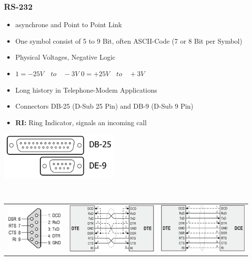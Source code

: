 \subsubsection{RS-232}
\begin{minipage}{10cm}
	\begin{itemize}
		\item asynchrone and Point to Point Link
		\item One symbol consist of 5 to 9 Bit, often \acs{ASCII}-Code (7 or 8 Bit per Symbol)
		\item Physical Voltages, Negative Logic
		\item $1=-25V \quad to \quad -3V$\newline
		$0=+25V\quad to \quad +3V$
		\item Long history in Telephone-Modem Applications
		\item Connectors DB-25 (D-Sub 25 Pin) and DB-9 (D-Sub 9 Pin)
		\item\textbf{RI: }Ring Indicator, signals an incoming call
	\end{itemize}
\end{minipage}
\begin{minipage}{6cm}
	\includegraphics[width=6cm]{images/Connectors_RS.png}
\end{minipage}
\\
\begin{tabular}{ccc}
	\includegraphics[width=4cm]{images/pin_RS.png} & \includegraphics[width=6cm]{images/cable2_RS.png} & \includegraphics[width=6cm]{images/cable_RS.png}\\
\end{tabular}
